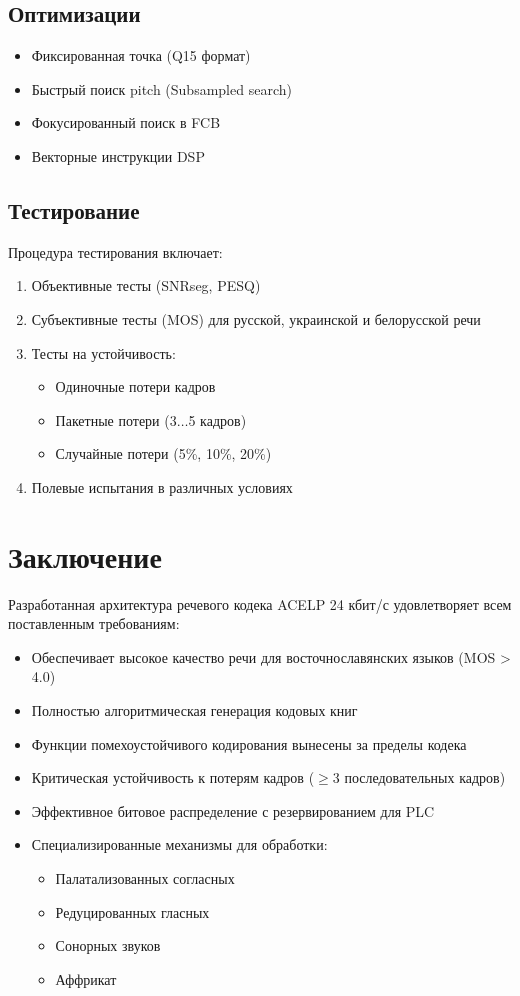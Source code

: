 \documentclass{report}
\begin{document}
	\section{Оптимизации}
	\begin{itemize}
		\item Фиксированная точка (Q15 формат)
		\item Быстрый поиск pitch (Subsampled search)
		\item Фокусированный поиск в FCB
		\item Векторные инструкции DSP
	\end{itemize}
	
	\section{Тестирование}
	Процедура тестирования включает:
	\begin{enumerate}
		\item Объективные тесты (SNRseg, PESQ)
		\item Субъективные тесты (MOS) для русской, украинской и белорусской речи
		\item Тесты на устойчивость:
		\begin{itemize}
			\item Одиночные потери кадров
			\item Пакетные потери (3$\ldots$5 кадров)
			\item Случайные потери (5\%, 10\%, 20\%)
		\end{itemize}
		\item Полевые испытания в различных условиях
	\end{enumerate}
	
	\chapter*{Заключение}
	Разработанная архитектура речевого кодека ACELP 24 кбит/с удовлетворяет всем поставленным требованиям:
	\begin{itemize}
		\item Обеспечивает высокое качество речи для восточнославянских языков (MOS > 4.0)
		\item Полностью алгоритмическая генерация кодовых книг
		\item Функции помехоустойчивого кодирования вынесены за пределы кодека
		\item Критическая устойчивость к потерям кадров ($\geqslant$3 последовательных кадров)
		\item Эффективное битовое распределение с резервированием для PLC
		\item Специализированные механизмы для обработки:
		\begin{itemize}
			\item Палатализованных согласных
			\item Редуцированных гласных
			\item Сонорных звуков
			\item Аффрикат
		\end{itemize}
	\end{itemize}
	
\end{document}
